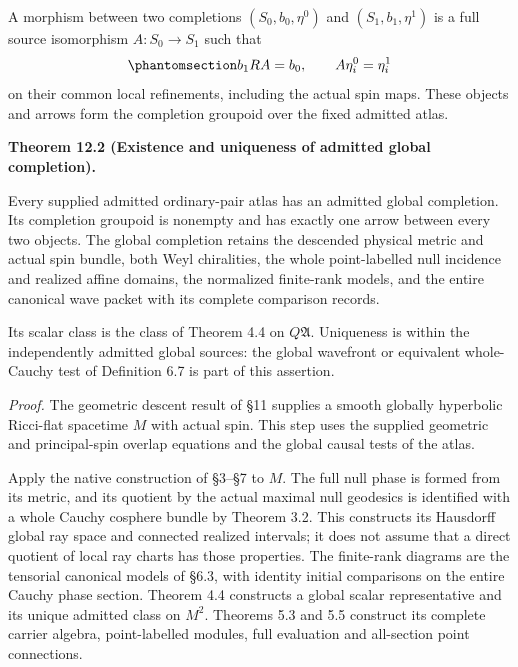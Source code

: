 \documentclass[
  english,
  11pt,
  reqno]{amsart}
\makeatletter
\newcounter{none} %
\newcommand{\pandocstatementheading}[1]{%
  \par\if@nobreak\else
    \addpenalty{\@beginparpenalty}%
    \addvspace{.5\baselineskip plus .2\baselineskip minus .2\baselineskip}%
  \fi
  {\normalfont\bfseries #1\par}%
  \nobreak\@afterindenttrue\@afterheading
}
\makeatother
\begin{document}
A morphism between two completions \((S_0,b_0,\eta^0)\) and
\((S_1,b_1,\eta^1)\) is a full source isomorphism \(A:S_0\to S_1\) such
that
\begin{equation}\protect\phantomsection\label{eq:ordinary-atlas-completion-arrow}{
b_1RA=b_0,
\qquad
A\eta_i^0=\eta_i^1
}\end{equation} on their common local refinements, including the actual
spin maps. These objects and arrows form the completion groupoid over
the fixed admitted atlas.

\pandocstatementheading{\protect{}\label{thm:ordinary-atlas-admitted-completion}Theorem 12.2 (Existence and uniqueness of admitted global completion).}

Every supplied admitted ordinary-pair atlas has an admitted global
completion. Its completion groupoid is nonempty and has exactly one
arrow between every two objects. The global completion retains the
descended physical metric and actual spin bundle, both Weyl chiralities,
the whole point-labelled null incidence and realized affine domains, the
normalized finite-rank models, and the entire canonical wave packet with
its complete comparison records.

Its scalar class is the class of Theorem 4.4 on \(Q\mathfrak A\).
Uniqueness is within the independently admitted global sources: the
global wavefront or equivalent whole-Cauchy test of Definition 6.7 is
part of this assertion.

\emph{Proof.} The geometric descent result of §11 supplies a smooth
globally hyperbolic Ricci-flat spacetime \(M\) with actual spin. This
step uses the supplied geometric and principal-spin overlap equations
and the global causal tests of the atlas.

Apply the native construction of §3--§7 to \(M\). The full null phase is
formed from its metric, and its quotient by the actual maximal null
geodesics is identified with a whole Cauchy cosphere bundle by Theorem
3.2. This constructs its Hausdorff global ray space and connected
realized intervals; it does not assume that a direct quotient of local
ray charts has those properties. The finite-rank diagrams are the
tensorial canonical models of §6.3, with identity initial comparisons on
the entire Cauchy phase section. Theorem 4.4 constructs a global scalar
representative and its unique admitted class on \(M^2\). Theorems 5.3
and 5.5 construct its complete carrier algebra, point-labelled modules,
full evaluation and all-section point connections.
\end{document}
